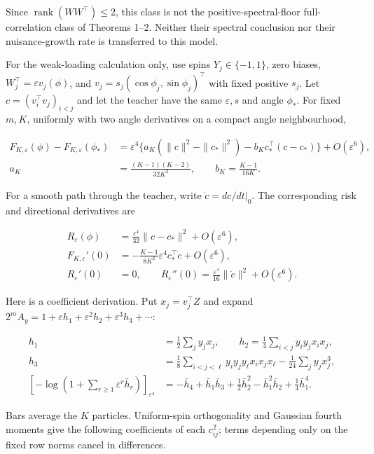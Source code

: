\documentclass{article}
\begin{document}
Since \(\operatorname{rank}(WW^\top)\le2\), this class is not the
positive-spectral-floor full-correlation class of Theorems 1--2. Neither
their spectral conclusion nor their nuisance-growth rate is transferred
to this model.

For the weak-loading calculation only, use spins \(Y_j\in\{-1,1\}\),
zero biases, \(W_j^\top=\varepsilon v_j(\phi)\), and
\(v_j=s_j(\cos\phi_j,\sin\phi_j)^\top\) with fixed positive \(s_j\). Let
\(c=(v_i^\top v_j)_{i<j}\) and let the teacher have the same
\(\varepsilon,s\) and angle \(\phi_*\). For fixed \(m,K\), uniformly
with two angle derivatives on a compact angle neighbourhood,

\[
\begin{aligned}
F_{K,\varepsilon}(\phi)-F_{K,\varepsilon}(\phi_*)
&=\varepsilon^4\{a_K(\|c\|^2-\|c_*\|^2)-b_Kc_*^\top(c-c_*)\}+O(\varepsilon^6),\\
a_K&=\frac{(K-1)(K-2)}{32K^2},\qquad b_K=\frac{K-1}{16K}.
\end{aligned}
\tag{I.2}
\]

For a smooth path through the teacher, write \(\dot c=dc/dt|_0\). The
corresponding risk and directional derivatives are

\[
\begin{aligned}
R_\varepsilon(\phi)&=\frac{\varepsilon^4}{32}\|c-c_*\|^2+O(\varepsilon^6),\\
F_{K,\varepsilon}'(0)&=-\frac{K-1}{8K^2}\varepsilon^4c_*^\top\dot c+O(\varepsilon^6),\\
R_\varepsilon'(0)&=0,\qquad
R_\varepsilon''(0)=\frac{\varepsilon^4}{16}\|\dot c\|^2+O(\varepsilon^6).
\end{aligned}
\tag{I.3}
\]

Here is a coefficient derivation. Put \(x_j=v_j^\top Z\) and expand
\(2^mA_y=1+\varepsilon h_1+\varepsilon^2h_2+\varepsilon^3h_3+\cdots\):

\[
\begin{aligned}
h_1&=\tfrac12\sum_jy_jx_j,\qquad h_2=\tfrac14\sum_{i<j}y_iy_jx_ix_j,\\
h_3&=\tfrac18\sum_{i<j<\ell}y_iy_jy_\ell x_ix_jx_\ell-\tfrac1{24}\sum_jy_jx_j^3,\\
[-\log(1+\textstyle\sum_{r\ge1}\varepsilon^r\bar h_r)]_{\varepsilon^4}
&=-\bar h_4+\bar h_1\bar h_3+\tfrac12\bar h_2^2-\bar h_1^2\bar h_2+\tfrac14\bar h_1^4.
\end{aligned}
\tag{I.4}
\]

Bars average the \(K\) particles. Uniform-spin orthogonality and
Gaussian fourth moments give the following coefficients of each
\(c_{ij}^2\); terms depending only on the fixed row norms cancel in
differences.
\end{document}

